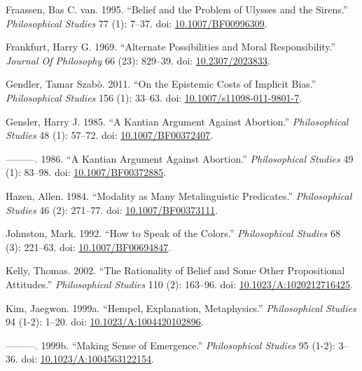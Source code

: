 \documentclass[
  10pt,
  letterpaper,
  DIV=11,
  numbers=noendperiod,
  twoside]{scrartcl}
\newlength{\cslhangindent}
\newenvironment{CSLReferences}[2] %
 {\begin{list}{}{%
  \setlength{\itemindent}{0pt}
  \setlength{\leftmargin}{0pt}
  \setlength{\parsep}{0pt}
  \ifodd #1
   \setlength{\leftmargin}{\cslhangindent}
   \setlength{\itemindent}{-1\cslhangindent}
  \fi
  \setlength{\itemsep}{#2\baselineskip}}}
 {\end{list}}
\begin{document}
\begin{CSLReferences}{1}{0}
Fraassen, Bas C. van. 1995. {``Belief and the Problem of Ulysses and the
Sirens.''} \emph{Philosophical Studies} 77 (1): 7--37. doi:
\href{https://doi.org/10.1007/BF00996309}{10.1007/BF00996309}.

Frankfurt, Harry G. 1969. {``Alternate Possibilities and Moral
Responsibility.''} \emph{Journal Of Philosophy} 66 (23): 829--39. doi:
\href{https://doi.org/10.2307/2023833}{10.2307/2023833}.

Gendler, Tamar Szabò. 2011. {``On the Epistemic Costs of Implicit
Bias.''} \emph{Philosophical Studies} 156 (1): 33--63. doi:
\href{https://doi.org/10.1007/s11098-011-9801-7}{10.1007/s11098-011-9801-7}.

Gensler, Harry J. 1985. {``A Kantian Argument Against Abortion.''}
\emph{Philosophical Studies} 48 (1): 57--72. doi:
\href{https://doi.org/10.1007/BF00372407}{10.1007/BF00372407}.

---------. 1986. {``A Kantian Argument Against Abortion.''}
\emph{Philosophical Studies} 49 (1): 83--98. doi:
\href{https://doi.org/10.1007/BF00372885}{10.1007/BF00372885}.

Hazen, Allen. 1984. {``Modality as Many Metalinguistic Predicates.''}
\emph{Philosophical Studies} 46 (2): 271--77. doi:
\href{https://doi.org/10.1007/BF00373111}{10.1007/BF00373111}.

Johnston, Mark. 1992. {``How to Speak of the Colors.''}
\emph{Philosophical Studies} 68 (3): 221--63. doi:
\href{https://doi.org/10.1007/BF00694847}{10.1007/BF00694847}.

Kelly, Thomas. 2002. {``The Rationality of Belief and Some Other
Propositional Attitudes.''} \emph{Philosophical Studies} 110 (2):
163--96. doi:
\href{https://doi.org/10.1023/A:1020212716425}{10.1023/A:1020212716425}.

Kim, Jaegwon. 1999a. {``Hempel, Explanation, Metaphysics.''}
\emph{Philosophical Studies} 94 (1-2): 1--20. doi:
\href{https://doi.org/10.1023/A:1004420102896}{10.1023/A:1004420102896}.

---------. 1999b. {``Making Sense of Emergence.''} \emph{Philosophical
Studies} 95 (1-2): 3--36. doi:
\href{https://doi.org/10.1023/A:1004563122154}{10.1023/A:1004563122154}.


\end{CSLReferences}
\end{document}
